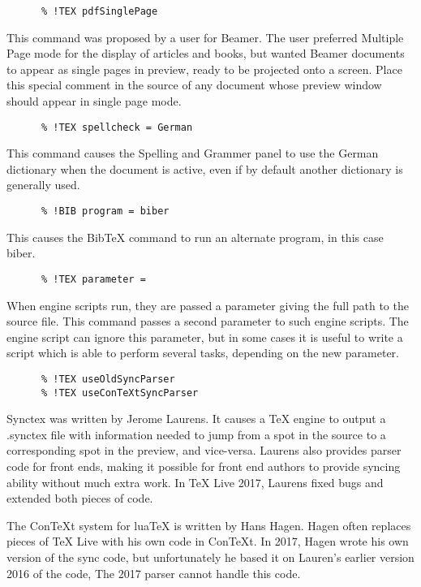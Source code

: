 \documentclass[11pt, oneside]{article}   	%
\begin{document}
 \begin{verbatim}
      % !TEX pdfSinglePage
 \end{verbatim}
 This command was proposed by a user for  Beamer. The user preferred Multiple Page mode for the  display of articles and books, but wanted Beamer documents to appear as single pages in preview, ready to be projected onto a screen. Place this special comment in the source of any document whose preview window should appear in single page mode.
 
  \begin{verbatim}
      % !TEX spellcheck = German
 \end{verbatim}
 This command causes the Spelling and Grammer panel to use the German dictionary when the document is active, even if by default another dictionary is generally used.
 
  \begin{verbatim}
      % !BIB program = biber
 \end{verbatim}
 This causes the BibTeX command to run an alternate program, in this case biber.    
  
  \begin{verbatim}
      % !TEX parameter = 
 \end{verbatim}
When engine scripts run, they are passed a parameter giving the full path to the source file. This command passes a second parameter to such engine scripts. The engine script can ignore this parameter, but in some cases it is useful to write a script which is able to perform several tasks, depending on the new parameter.  
     
  \begin{verbatim}
      % !TEX useOldSyncParser
      % !TEX useConTeXtSyncParser
 \end{verbatim}
Synctex was written by Jerome Laurens. It causes a TeX engine to output a .synctex file with information needed to jump from a spot in the source to a corresponding spot in the preview, and vice-versa. Laurens also provides parser code for front ends, making it possible for front end authors to provide syncing ability without much extra work. In TeX Live 2017, Laurens fixed bugs and extended both pieces of code.

The ConTeXt system for luaTeX is written by Hans Hagen. Hagen often replaces pieces of TeX Live with his own code in ConTeXt. In 2017, Hagen wrote his own version of the sync code, but unfortunately he based it on Lauren's earlier version 2016 of the code, The 2017 parser cannot handle this code.
\end{document}
